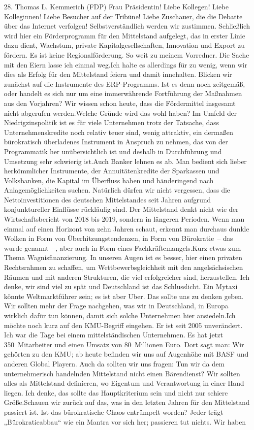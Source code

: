 \documentclass{article}
\begin{document}
	28. Thomas L. Kemmerich (FDP) Frau Präsidentin! Liebe Kollegen! Liebe Kolleginnen! Liebe Besucher auf der Tribüne! Liebe Zuschauer, die die Debatte über das Internet verfolgen! Selbstverständlich werden wir zustimmen. Schließlich wird hier ein Förderprogramm für den Mittelstand aufgelegt, das in erster Linie dazu dient, Wachstum, private Kapitalgesellschaften, Innovation und Export zu fördern. Es ist keine Regionalförderung. So weit zu meinem Vorredner. Die Sache mit den Eiern lasse ich einmal weg.Ich halte es allerdings für zu wenig, wenn wir dies als Erfolg für den Mittelstand feiern und damit innehalten. Blicken wir zunächst auf die Instrumente des ERP-Programms. Ist es denn noch zeitgemäß, oder handelt es sich nur um eine immerwährende Fortführung der Maßnahmen aus den Vorjahren? Wir wissen schon heute, dass die Fördermittel insgesamt nicht abgerufen werden.Welche Gründe wird das wohl haben? Im Umfeld der Niedrigzinspolitik ist es für viele Unternehmen trotz der Tatsache, dass Unternehmenskredite noch relativ teuer sind, wenig attraktiv, ein dermaßen bürokratisch überladenes Instrument in Anspruch zu nehmen, das von der Programmatik her unübersichtlich ist und deshalb in Durchführung und Umsetzung sehr schwierig ist.Auch Banker lehnen es ab. Man bedient sich lieber herkömmlicher Instrumente, der Annuitätenkredite der Sparkassen und Volksbanken, die Kapital im Überfluss haben und händeringend nach Anlagemöglichkeiten suchen. Natürlich dürfen wir nicht vergessen, dass die Nettoinvestitionen des deutschen Mittelstandes seit Jahren aufgrund konjunktureller Einflüsse rückläufig sind. Der Mittelstand denkt nicht wie der Wirtschaftsbericht von 2018 bis 2019, sondern in längeren Perioden. Wenn man einmal auf einen Horizont von zehn Jahren schaut, erkennt man durchaus dunkle Wolken in Form von Überhitzungstendenzen, in Form von Bürokratie – das wurde genannt –, aber auch in Form eines Fachkräftemangels.Kurz etwas zum Thema Wagnisfinanzierung. In unseren Augen ist es besser, hier einen privaten Rechtsrahmen zu schaffen, um Wettbewerbsgleichheit mit den angelsächsischen Räumen und mit anderen Strukturen, die viel erfolgreicher sind, herzustellen. Ich denke, wir sind viel zu spät und Deutschland ist das Schlusslicht. Ein Mytaxi könnte Weltmarktführer sein; es ist aber Uber. Das sollte uns zu denken geben. Wir sollten mehr der Frage nachgehen, was wir in Deutschland, in Europa wirklich dafür tun können, damit sich solche Unternehmen hier ansiedeln.Ich möchte noch kurz auf den KMU-Begriff eingehen. Er ist seit 2005 unverändert. Ich war die Tage bei einem mittelständischen Unternehmen. Es hat jetzt 350 Mitarbeiter und einen Umsatz von 80 Millionen Euro. Dort sagt man: Wir gehörten zu den KMU; ab heute befinden wir uns auf Augenhöhe mit BASF und anderen Global Playern. Auch da sollten wir uns fragen: Tun wir da dem unternehmerisch handelnden Mittelstand nicht einen Bärendienst? Wir sollten alles als Mittelstand definieren, wo Eigentum und Verantwortung in einer Hand liegen. Ich denke, das sollte das Hauptkriterium sein und nicht nur schiere Größe.Schauen wir zurück auf das, was in den letzten Jahren für den Mittelstand passiert ist. Ist das bürokratische Chaos entrümpelt worden? Jeder trägt „Bürokratieabbau“ wie ein Mantra vor sich her; passieren tut nichts. Wir haben 
\end{document}
